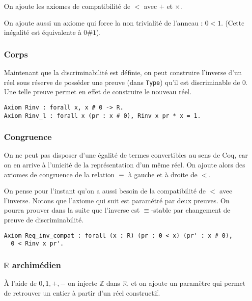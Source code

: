 \documentclass[10pt]{article}
\begin{document}
On ajoute les axiomes de compatibilité de $<$ avec $+$ et $\times$.

On ajoute aussi un axiome qui force la non trivialité de l'anneau : $0 < 1$. (Cette inégalité est équivalente à $0 \# 1$).

\subsubsection{Corps}

Maintenant que la discriminabilité est définie, on peut construire l'inverse d'un réel sous réserve de posséder une preuve (dans {\tt Type}) qu'il est discriminable de 0. Une telle preuve permet en effet de construire le nouveau réel.

\begin{verbatim}
Axiom Rinv : forall x, x # 0 -> R.
Axiom Rinv_l : forall x (pr : x # 0), Rinv x pr * x = 1.
\end{verbatim}

\subsubsection{Congruence}

On ne peut pas disposer d'une égalité de termes convertibles au sens de Coq, car on en arrive à l'unicité de la représentation d'un même réel. On ajoute alors des axiomes de congruence de la relation $\equiv$ à gauche et à droite de $<$.

On pense pour l'instant qu'on a aussi besoin de la compatibilité de $<$ avec l'inverse. Notons que l'axiome qui suit est paramétré par deux preuves. On pourra prouver dans la suite que l'inverse est $\equiv$-stable par changement de preuve de discriminabilité.

\begin{verbatim}
Axiom Req_inv_compat : forall (x : R) (pr : 0 < x) (pr' : x # 0),
  0 < Rinv x pr'.
\end{verbatim}

\subsubsection{$\mathbb{R}$ archimédien}

À l'aide de $0, 1, +, -$ on injecte $\mathbb{Z}$ dans $\mathbb{R}$, et on ajoute un paramètre qui permet de retrouver un entier à partir d'un réel constructif.
\end{document}
